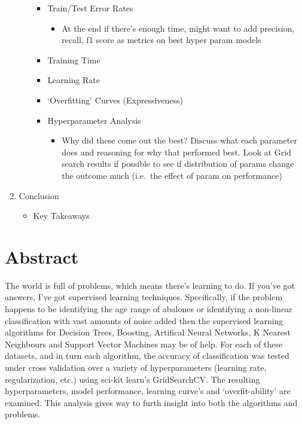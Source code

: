 \documentclass[11pt]{article}
\providecommand{\tightlist}{%
      \setlength{\itemsep}{0pt}\setlength{\parskip}{0pt}}
\begin{document}
\begin{enumerate}
\begin{itemize}
    \begin{itemize}
    \tightlist
    \item
      Train/Test Error Rates

      \begin{itemize}
      \tightlist
      \item
        At the end if there's enough time, might want to add precision,
        recall, f1 score as metrics on best hyper param models
      \end{itemize}
    \item
      Training Time
    \item
      Learning Rate
    \item
      `Overfitting' Curves (Expressiveness)
    \item
      Hyperparameter Analysis

      \begin{itemize}
      \tightlist
      \item
        Why did these come out the best? Discuss what each parameter
        does and reasoning for why that performed best. Look at Grid
        search results if possible to see if distribution of params
        change the outcome much (i.e.~the effect of param on
        performance)
      \end{itemize}
    \end{itemize}
  \end{itemize}
\item
  Conclusion

  \begin{itemize}
  \tightlist
  \item
    Key Takeaways
  \end{itemize}
\end{enumerate}

    \hypertarget{abstract}{%
\section{Abstract}\label{abstract}}

    The world is full of problems, which means there's learning to do. If
you've got answers, I've got supervised learning techniques.
Specifically, if the problem happens to be identifying the age range of
abalones or identifying a non-linear classification with vast amounts of
noise added then the supervised learning algorithms for Decision Trees,
Boosting, Artifical Neural Networks, K Nearest Neighbours and Support
Vector Machines may be of help. For each of these datasets, and in turn
each algorithm, the accuracy of classification was tested under cross
validation over a variety of hyperparameters (learning rate,
regularization, etc.) using sci-kit learn's GridSearchCV. The resulting
hyperparameters, model performance, learning curve's and
`overfit-ability' are examined. This analysis gives way to furth insight
into both the algorithms and problems.
\end{document}
